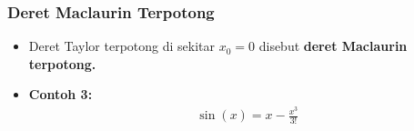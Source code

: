 \documentclass[pdflatex,compress]{beamer}
\begin{document}
\begin{frame}
	\frametitle{Deret Maclaurin Terpotong}
	\begin{itemize}
		\item Deret Taylor terpotong di sekitar $ x_0 = 0 $ disebut \textbf{deret Maclaurin terpotong.}
		\item \textbf{Contoh 3:}
		\begin{align*}
			\sin(x) = x - \frac{x^3}{3!}
		\end{align*}
	\end{itemize}
\end{frame}
	
\end{document}
